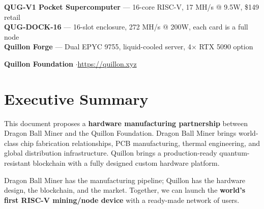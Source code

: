 \documentclass[11pt,a4paper]{article}
\begin{document}
\begin{center}
\begin{tcolorbox}[
    enhanced, colback=qnkpurple!5, colframe=qnkpurple!50,
    boxrule=0.5pt, arc=8pt, width=13cm, center, fontupper=\centering
]
{\small\textcolor{qnkslate}{
\textbf{QUG-V1 Pocket Supercomputer} --- 16-core RISC-V, 17 MH/s @ 9.5W, \$149 retail\\[4pt]
\textbf{QUG-DOCK-16} --- 16-slot enclosure, 272 MH/s @ 200W, each card is a full node\\[4pt]
\textbf{Quillon Forge} --- Dual EPYC 9755, liquid-cooled server, 4$\times$ RTX 5090 option
}}
\end{tcolorbox}

\vfill

{\small\textcolor{qnkslate}{
\textbf{Quillon Foundation} \quad$\cdot$\quad \url{https://quillon.xyz}
}}

\end{center}
\newpage

\tableofcontents
\newpage

\section{Executive Summary}

This document proposes a \textbf{hardware manufacturing partnership} between Dragon Ball Miner and the Quillon Foundation. Dragon Ball Miner brings world-class chip fabrication relationships, PCB manufacturing, thermal engineering, and global distribution infrastructure. Quillon brings a production-ready quantum-resistant blockchain with a fully designed custom hardware platform.

\begin{highlight}
Dragon Ball Miner has the manufacturing pipeline; Quillon has the hardware design, the blockchain, and the market. Together, we can launch the \textbf{world's first RISC-V mining/node device} with a ready-made network of users.
\end{highlight}
\end{document}
